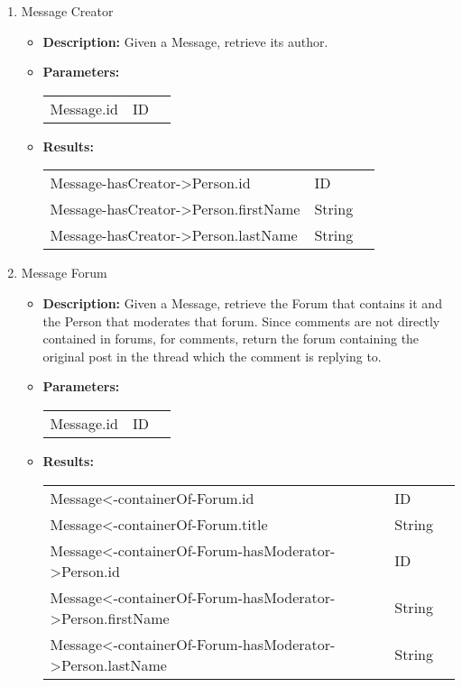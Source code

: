 {\begin{enumerate}
  \item Message Creator 
    \begin{itemize}
      \item \textbf{Description:}
        Given a Message, retrieve its author.
      \item \textbf{Parameters:} \\
        \begin{tabular}{lll}
          Message.id 										& ID \\
        \end{tabular}
      \item \textbf{Results:} \\
        \begin{tabular}{lll}
          Message-hasCreator->Person.id     									& ID \\
          Message-hasCreator->Person.firstName     									& String \\
          Message-hasCreator->Person.lastName    									& String \\
        \end{tabular}
    \end{itemize}

  \item Message Forum 
    \begin{itemize}
      \item \textbf{Description:}
        Given a Message, retrieve the Forum that contains it
        and the Person that moderates that forum. Since comments are not
        directly contained in forums, for comments, return the forum containing
        the original post in the thread which the comment is replying to. 
      \item \textbf{Parameters:} \\
        \begin{tabular}{lll}
          Message.id 										& ID \\
        \end{tabular}
      \item \textbf{Results:} \\
        \begin{tabular}{lll}
          Message<-containerOf-Forum.id                       & ID \\
          Message<-containerOf-Forum.title     									& String \\
          Message<-containerOf-Forum-hasModerator->Person.id     									& ID \\
          Message<-containerOf-Forum-hasModerator->Person.firstName    									& String \\
          Message<-containerOf-Forum-hasModerator->Person.lastName    									& String \\
        \end{tabular}
    \end{itemize}


\end{enumerate}}

